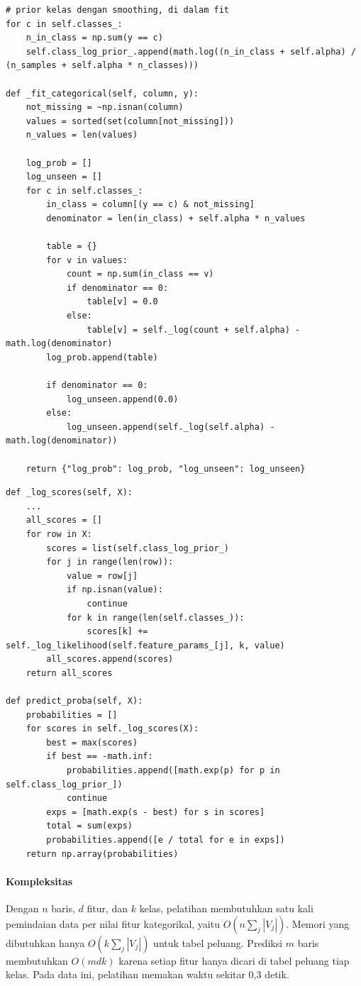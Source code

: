 \begin{lstlisting}[caption={Estimasi prior dan tabel peluang fitur kategorikal}, label={lst:nb-fit}]
# prior kelas dengan smoothing, di dalam fit
for c in self.classes_:
    n_in_class = np.sum(y == c)
    self.class_log_prior_.append(math.log((n_in_class + self.alpha) / (n_samples + self.alpha * n_classes)))

def _fit_categorical(self, column, y):
    not_missing = ~np.isnan(column)
    values = sorted(set(column[not_missing]))
    n_values = len(values)

    log_prob = []
    log_unseen = []
    for c in self.classes_:
        in_class = column[(y == c) & not_missing]
        denominator = len(in_class) + self.alpha * n_values

        table = {}
        for v in values:
            count = np.sum(in_class == v)
            if denominator == 0:
                table[v] = 0.0
            else:
                table[v] = self._log(count + self.alpha) - math.log(denominator)
        log_prob.append(table)

        if denominator == 0:
            log_unseen.append(0.0)
        else:
            log_unseen.append(self._log(self.alpha) - math.log(denominator))

    return {"log_prob": log_prob, "log_unseen": log_unseen}
\end{lstlisting}

\begin{lstlisting}[caption={Skor logaritma dan peluang posterior}, label={lst:nb-predict}]
def _log_scores(self, X):
    ...
    all_scores = []
    for row in X:
        scores = list(self.class_log_prior_)
        for j in range(len(row)):
            value = row[j]
            if np.isnan(value):
                continue
            for k in range(len(self.classes_)):
                scores[k] += self._log_likelihood(self.feature_params_[j], k, value)
        all_scores.append(scores)
    return all_scores

def predict_proba(self, X):
    probabilities = []
    for scores in self._log_scores(X):
        best = max(scores)
        if best == -math.inf:
            probabilities.append([math.exp(p) for p in self.class_log_prior_])
            continue
        exps = [math.exp(s - best) for s in scores]
        total = sum(exps)
        probabilities.append([e / total for e in exps])
    return np.array(probabilities)
\end{lstlisting}

\paragraph{Kompleksitas}
Dengan $n$ baris, $d$ fitur, dan $k$ kelas, pelatihan membutuhkan satu kali pemindaian data per nilai fitur kategorikal, yaitu $O\left(n\sum_j|V_j|\right)$. Memori yang dibutuhkan hanya $O\left(k\sum_j|V_j|\right)$ untuk tabel peluang. Prediksi $m$ baris membutuhkan $O(mdk)$ karena setiap fitur hanya dicari di tabel peluang tiap kelas. Pada data ini, pelatihan memakan waktu sekitar 0,3 detik.

